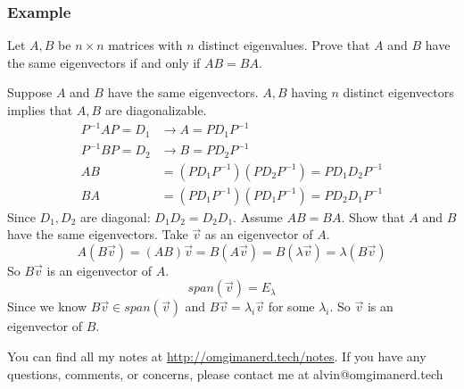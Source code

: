 \documentclass{math}
\begin{document}
\subsubsection*{Example}
Let \( A,B \) be \( n\times n \) matrices with \( n \) distinct eigenvalues.
Prove that \( A \) and \( B \) have the same eigenvectors if and only if
\( AB = BA \). \par
Suppose \( A \) and \( B \) have the same eigenvectors. \( A,B \) having \( n \)
distinct eigenvectors implies that \( A,B \) are diagonalizable.
\begin{align*}
  P^{-1}AP = D_1 &\to A = PD_1P^{-1} \\
  P^{-1}BP = D_2 &\to B = PD_2P^{-1} \\
  AB &= (PD_1P^{-1})(PD_2P^{-1}) = PD_1D_2P^{-1} \\
  BA &= (PD_1P^{-1})(PD_1P^{-1}) = PD_2D_1P^{-1}
\end{align*}
Since \( D_1,D_2 \) are diagonal: \( D_1D_2 = D_2D_1 \). Assume \( AB = BA \).
Show that \( A \) and \( B \) have the same eigenvectors. Take \( \vec{v} \)
as an eigenvector of \( A \).
\[ A(B\vec{v}) = (AB)\vec{v} = B(A\vec{v}) = B(\lambda\vec{v}) =
  \lambda(B\vec{v}) \]
So \( B\vec{v} \) is an eigenvector of \( A \).
\[ span(\vec{v}) = E_{\lambda} \]
Since we know \( B\vec{v}\in span(\vec{v}) \) and \( B\vec{v} =
\lambda_i\vec{v} \) for some \( \lambda_i \). So \( \vec{v} \) is an eigenvector
of \( B \).

\begin{center}
  You can find all my notes at \url{http://omgimanerd.tech/notes}. If you have
  any questions, comments, or concerns, please contact me at
  alvin@omgimanerd.tech
\end{center}
\end{document}
